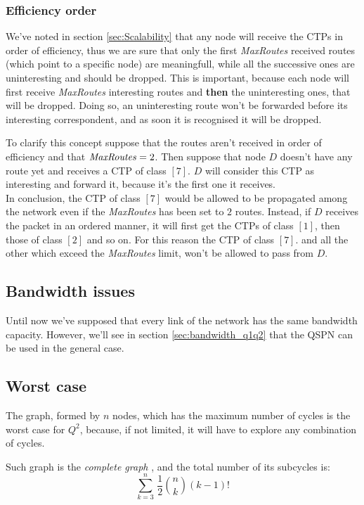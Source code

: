 \documentclass[a4paper]{article}
\begin{document}
\subsubsection{Efficiency order}
\label{sec:eff_order}

We've noted in section \ref{sec:Scalability} that any node will receive the
CTPs in order of efficiency, thus we are sure that only the first
\emph{MaxRoutes} received routes (which point to a specific node) are
meaningfull, while all the successive ones are uninteresting and should be
dropped. This is important, because each
node will first receive \emph{MaxRoutes} interesting routes and
\textbf{then} the uninteresting ones, that will be dropped. 
Doing so, an uninteresting route won't be forwarded before its interesting
correspondent, and as soon it is recognised it will be dropped.

To clarify this concept suppose that the routes aren't received in order of
efficiency and that $\textrm{\emph{MaxRoutes}}=2$. Then suppose that node $D$ doesn't
have any route yet and receives a CTP of class $[7]$. $D$ will consider this
CTP as interesting and forward it, because it's the first one it receives.\\
In conclusion, the CTP of class $[7]$ would be allowed to be propagated among
the network even if the \emph{MaxRoutes} has been set to $2$ routes.
Instead, if $D$ receives the packet in an ordered
manner, it will first get the CTPs of class $[1]$, then those of class $[2]$
and so on. For this reason the CTP of class $[7]$. and all the other which
exceed the \emph{MaxRoutes} limit, won't be allowed to pass from $D$.

\subsection{Bandwidth issues}
Until now we've supposed that every link of the network has the same bandwidth
capacity. However, we'll see in section \ref{sec:bandwidth_q1q2} that the QSPN
can be used in the general case.

\subsection{Worst case}
The graph, formed by $n$ nodes, which has the maximum number of cycles is the
worst case for $Q^2$, because, if not limited, it will have to explore any
combination of cycles.

Such graph is the \emph{complete graph} \cite{completegraph}, and the total
number of its subcycles is:
\[
\sum_{k=3}^n\,\frac{1}{2}\binom{n}{k}(k-1)!
\]
\end{document}
